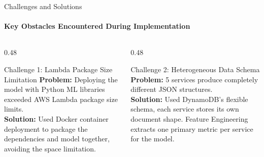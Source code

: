 \documentclass[aspectratio=169,11pt]{beamer}
\begin{document}
\begin{frame}{Challenges and Solutions}
\framesubtitle{Key Obstacles Encountered During Implementation}

\begin{columns}[T]
\begin{column}{0.48\textwidth}
\begin{block}{Challenge 1: Lambda Package Size Limitation}
{\small
\textbf{Problem:} Deploying the model with Python ML libraries exceeded AWS Lambda package size limits.\\
\textbf{Solution:} Used Docker container deployment to package the dependencies and model together, avoiding the space limitation.
\\
}
\end{block}
\end{column}

\begin{column}{0.48\textwidth}
\begin{block}{Challenge 2: Heterogeneous Data Schema}
{\small
\textbf{Problem:} 5 services produce completely different JSON structures.\\
\textbf{Solution:} Used DynamoDB's flexible schema, each service stores its own document shape. Feature Engineering extracts one primary metric per service for the model.
}
\end{block}
\end{column}
\end{columns}
\end{frame}
\end{document}
